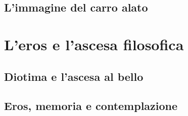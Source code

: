 \subsection{L'immagine del carro alato}

\section{L'eros e l'ascesa filosofica}

\subsection{Diotima e l'ascesa al bello}

\subsection{Eros, memoria e contemplazione}
